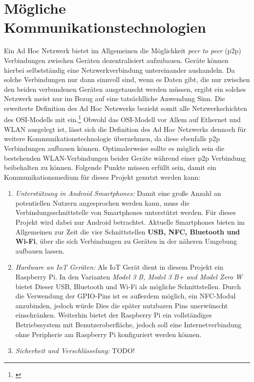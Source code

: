 \documentclass[12pt,a4paper]{article}
\begin{document}
    \section{Mögliche Kommunikationstechnologien}
        Ein Ad Hoc Netzwerk bietet im Allgemeinen die Möglichkeit {\it peer to peer} (p2p) Verbindungen zwischen Geräten dezentralisiert aufzubauen.
        Geräte können hierbei selbstständig eine Netzwerkverbindung untereinander aushandeln. Da solche Verbindungen nur dann sinnvoll sind,
        wenn es Daten gibt, die nur zwischen den beiden verbundenen Geräten ausgetauscht werden müssen, ergibt ein solches Netzwerk meist nur
        im Bezug auf eine tatsächlliche Anwendung Sinn. Die erweiterte Definition des Ad Hoc Netzwerks
        bezieht somit alle Netzwerkschichten des OSI-Modells mit ein.\footnote{\cite[S.23]{Sikora}}
        Obwohl das OSI-Modell vor Allem auf Ethernet und WLAN ausgelegt ist, lässt sich die Definition des Ad Hoc Netzwerks
        dennoch für weitere Kommunikationstechnologie übernehmen, da diese ebenfalls p2p Verbindungen aufbauen können.
        Optimalerweise sollte es möglich sein die bestehenden WLAN-Verbindungen beider Geräte während einer p2p Verbindung beibehalten zu können.
        Folgende Punkte müssen erfüllt sein, damit ein Kommunikationsmedium für dieses Projekt genutzt werden kann:
        \begin {enumerate}
        \item {\it Unterstützung in Android Smartphones:}
        Damit eine große Anzahl an potentiellen Nutzern angesprochen werden kann, muss die Verbindungsschnittstelle von Smartphones unterstützt werden.
        Für dieses Projekt wird dabei nur Android betrachtet.
        Aktuelle Smartphones bieten im Allgemeinen zur Zeit die vier Schnittstellen {\bf USB, NFC, Bluetooth und Wi-Fi},
        über die sich Verbindungen zu Geräten in der näheren Umgebung aufbauen lassen.
        \item {\it Hardware an IoT Geräten:}
        Als IoT Gerät dient in diesem Projekt ein Raspberry Pi.
        In den Varianten {\it Model 3 B, Model 3 B+ and Model Zero W} bietet Dieser USB, Bluetooth und Wi-Fi als mögliche Schnittstellen.
        Durch die Verwendung der GPIO-Pins ist es außerdem möglich, ein NFC-Modul anzubinden,
        jedoch würde Dies die später nutzbaren Pins unerwünscht einschränken.
        Weiterhin bietet der Raspberry Pi ein vollständiges Betriebssystem mit Benutzeroberfläche, jedoch soll eine Internetverbindung
        ohne Peripherie am Raspberry Pi konfiguriert werden können. 
        \item {\it Sicherheit und Verschlüsselung:}
        TODO!
        \end {enumerate}
\end{document}
